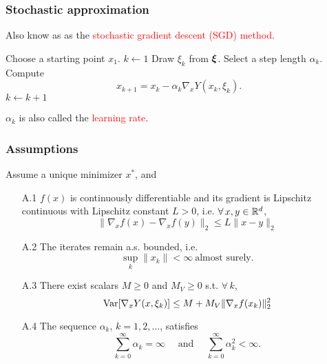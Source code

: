 \documentclass[usepdftitle=false, aspectratio=169]{beamer}
\begin{document}
\begin{frame}
\frametitle{Stochastic approximation}

Also know as as the \textcolor{red}{stochastic gradient descent (SGD) method}.

\mbox{}

\begin{algorithmic}
\State Choose a starting point $x_1$.
\State $k \leftarrow 1$
\State Draw $\xi_k$ from ${\boldsymbol{\xi}}$.
\State Select a step length $\alpha_k$.
\State Compute
$$
x_{k+1} = x_k - \alpha_k \nabla_x Y(x_k, \xi_k).
$$
\State $k \leftarrow k+1$
\EndWhile
\end{algorithmic}

\mbox{}

$\alpha_k$ is also called the \textcolor{red}{learning rate}.

\end{frame}

\begin{frame}
\frametitle{Assumptions}


Assume a unique minimizer $x^*$, and
\begin{enumerate}
\item[A.1]
$f(x)$ is continuously differentiable and its gradient is Lipschitz continuous with Lipschitz constant $L > 0$, i.e. $\forall\, x, y \in {\mathbb{R}}^d$,
$$
\| \nabla_x f(x) - \nabla_x f(y) \|_2 \leq L \| x - y \|_2
$$
\item[A.2]
The iterates remain a.s. bounded, i.e.
$$
\sup_k \| x_k \| < \infty\ \text{almost surely}.
$$
\item[A.3]
There exist scalars $M \geq 0$ and $M_V \geq 0$ s.t. $\forall\, k$,
$$
\operatorname{Var}[\nabla_x Y(x, \xi_k)] \leq M + M_V\| \nabla_x f(x_k)\|_2^2
$$
\item[A.4]
The sequence $\alpha_k$, $k=1,2,\ldots$, satisfies
$$
\sum_{k=0}^{\infty}\alpha_k=\infty \quad \mbox{ and } \quad \sum_{k=0}^{\infty}\alpha_k^{2} < \infty.
$$
\end{enumerate}

\end{frame}
\end{document}
